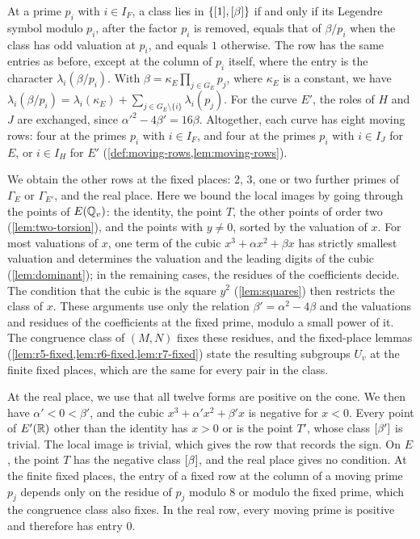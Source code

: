 At a prime $p_i$ with $i\in I_F$, a class lies in $\{[1],[\beta]\}$ if and only if its Legendre symbol modulo $p_i$, after the factor $p_i$ is removed, equals that of $\beta/p_i$ when the class has odd valuation at $p_i$, and equals $1$ otherwise. The row has the same entries as before, except at the column of $p_i$ itself, where the entry is the character $\lambda_i(\beta/p_i)$. With $\beta=\kappa_E\prod_{j\in G_E}p_j$, where $\kappa_E$ is a constant, we have $\lambda_i(\beta/p_i)=\lambda_i(\kappa_E)+\sum_{j\in G_E\setminus\{i\}}\lambda_i(p_j)$. For the curve $E'$, the roles of $H$ and $J$ are exchanged, since $\alpha'^2-4\beta'=16\beta$. Altogether, each curve has eight moving rows: four at the primes $p_i$ with $i\in I_F$, and four at the primes $p_i$ with $i\in I_J$ for $E$, or $i\in I_H$ for $E'$ (\cref{def:moving-rows,lem:moving-rows}).

We obtain the other rows at the fixed places: $2$, $3$, one or two further primes of $\Gamma_E$ or $\Gamma_{E'}$, and the real place. Here we bound the local images by going through the points of $E(\mathbb Q_v)$: the identity, the point $T$, the other points of order two (\cref{lem:two-torsion}), and the points with $y\ne0$, sorted by the valuation of $x$. For most valuations of $x$, one term of the cubic $x^3+\alpha x^2+\beta x$ has strictly smallest valuation and determines the valuation and the leading digits of the cubic (\cref{lem:dominant}); in the remaining cases, the residues of the coefficients decide. The condition that the cubic is the square $y^2$ (\cref{lem:squares}) then restricts the class of $x$. These arguments use only the relation $\beta'=\alpha^2-4\beta$ and the valuations and residues of the coefficients at the fixed prime, modulo a small power of it. The congruence class of $(M,N)$ fixes these residues, and the fixed-place lemmas (\cref{lem:r5-fixed,lem:r6-fixed,lem:r7-fixed}) state the resulting subgroups $U_v$ at the finite fixed places, which are the same for every pair in the class.

At the real place, we use that all twelve forms are positive on the cone. We then have $\alpha'<0<\beta'$, and the cubic $x^3+\alpha'x^2+\beta'x$ is negative for $x<0$. Every point of $E'(\mathbb R)$ other than the identity has $x>0$ or is the point $T'$, whose class $[\beta']$ is trivial. The local image is trivial, which gives the row that records the sign. On $E$, the point $T$ has the negative class $[\beta]$, and the real place gives no condition. At the finite fixed places, the entry of a fixed row at the column of a moving prime $p_j$ depends only on the residue of $p_j$ modulo $8$ or modulo the fixed prime, which the congruence class also fixes. In the real row, every moving prime is positive and therefore has entry $0$.

